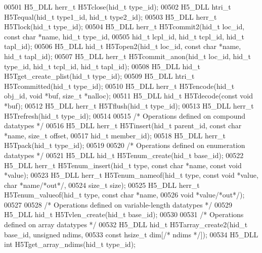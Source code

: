 \begin{DoxyCode}
00501 H5\_DLL herr\_t H5Tclose(hid\_t type\_id);
00502 H5\_DLL htri\_t H5Tequal(hid\_t type1\_id, hid\_t type2\_id);
00503 H5\_DLL herr\_t H5Tlock(hid\_t type\_id);
00504 H5\_DLL herr\_t H5Tcommit2(hid\_t loc\_id, \textcolor{keyword}{const} \textcolor{keywordtype}{char} *name, hid\_t type\_id,
00505     hid\_t lcpl\_id, hid\_t tcpl\_id, hid\_t tapl\_id);
00506 H5\_DLL hid\_t H5Topen2(hid\_t loc\_id, \textcolor{keyword}{const} \textcolor{keywordtype}{char} *name, hid\_t tapl\_id);
00507 H5\_DLL herr\_t H5Tcommit\_anon(hid\_t loc\_id, hid\_t type\_id, hid\_t tcpl\_id, hid\_t tapl\_id);
00508 H5\_DLL hid\_t H5Tget\_create\_plist(hid\_t type\_id);
00509 H5\_DLL htri\_t H5Tcommitted(hid\_t type\_id);
00510 H5\_DLL herr\_t H5Tencode(hid\_t obj\_id, \textcolor{keywordtype}{void} *buf, \textcolor{keywordtype}{size\_t} *nalloc);
00511 H5\_DLL hid\_t H5Tdecode(\textcolor{keyword}{const} \textcolor{keywordtype}{void} *buf);
00512 H5\_DLL herr\_t H5Tflush(hid\_t type\_id);
00513 H5\_DLL herr\_t H5Trefresh(hid\_t type\_id);
00514 
00515 \textcolor{comment}{/* Operations defined on compound datatypes */}
00516 H5\_DLL herr\_t H5Tinsert(hid\_t parent\_id, \textcolor{keyword}{const} \textcolor{keywordtype}{char} *name, \textcolor{keywordtype}{size\_t} offset,
00517              hid\_t member\_id);
00518 H5\_DLL herr\_t H5Tpack(hid\_t type\_id);
00519 
00520 \textcolor{comment}{/* Operations defined on enumeration datatypes */}
00521 H5\_DLL hid\_t H5Tenum\_create(hid\_t base\_id);
00522 H5\_DLL herr\_t H5Tenum\_insert(hid\_t type, \textcolor{keyword}{const} \textcolor{keywordtype}{char} *name, \textcolor{keyword}{const} \textcolor{keywordtype}{void} *value);
00523 H5\_DLL herr\_t H5Tenum\_nameof(hid\_t type, \textcolor{keyword}{const} \textcolor{keywordtype}{void} *value, \textcolor{keywordtype}{char} *name\textcolor{comment}{/*out*/},
00524                  \textcolor{keywordtype}{size\_t} size);
00525 H5\_DLL herr\_t H5Tenum\_valueof(hid\_t type, \textcolor{keyword}{const} \textcolor{keywordtype}{char} *name,
00526                   \textcolor{keywordtype}{void} *value\textcolor{comment}{/*out*/});
00527 
00528 \textcolor{comment}{/* Operations defined on variable-length datatypes */}
00529 H5\_DLL hid\_t H5Tvlen\_create(hid\_t base\_id);
00530 
00531 \textcolor{comment}{/* Operations defined on array datatypes */}
00532 H5\_DLL hid\_t H5Tarray\_create2(hid\_t base\_id, \textcolor{keywordtype}{unsigned} ndims,
00533             \textcolor{keyword}{const} hsize\_t dim[\textcolor{comment}{/* ndims */}]);
00534 H5\_DLL \textcolor{keywordtype}{int} H5Tget\_array\_ndims(hid\_t type\_id);

\end{DoxyCode}
